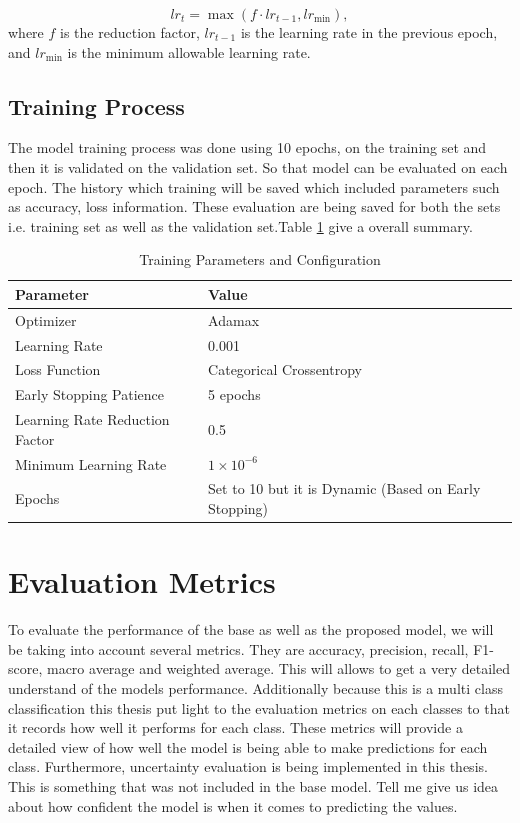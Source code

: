 \documentclass[12pt,onecolumn]{report}
\begin{document}
\begin{equation}
    lr_t = \max(f \cdot lr_{t-1}, lr_{\text{min}}),
\end{equation}
where \(f\) is the reduction factor, \(lr_{t-1}\) is the learning rate in the previous epoch, and \(lr_{\text{min}}\) is the minimum allowable learning rate.

\subsection{Training Process}
The model training process was done using 10 epochs, on the training set and then it is validated on the validation set. So that model can be evaluated on each epoch. The history which training will be saved which included parameters such as accuracy, loss information. These evaluation are being saved for both the sets i.e. training set as well as the validation set.Table \ref{tab:training_parameters} give a overall summary.

\begin{table}[h]
    \centering
    \caption{Training Parameters and Configuration}
    \label{tab:training_parameters}
    \begin{tabular}{|l|l|}
        \hline
        \textbf{Parameter} & \textbf{Value} \\
        \hline
        Optimizer          & Adamax \\
        Learning Rate      & 0.001 \\
        Loss Function      & Categorical Crossentropy \\
        Early Stopping Patience & 5 epochs \\
        Learning Rate Reduction Factor & 0.5 \\
        Minimum Learning Rate & \(1 \times 10^{-6}\) \\
        Epochs             & Set to 10 but it is Dynamic (Based on Early Stopping) \\
        \hline
    \end{tabular}
\end{table}

\section{Evaluation Metrics}

To evaluate the performance of the base as well as the proposed model, we will be taking into account several metrics. They are  accuracy, precision, recall, F1-score, macro average and weighted average. This will allows to get a very detailed understand of the models performance. Additionally because this is a multi class classification this thesis put light to the evaluation metrics on each classes to that it records how well it performs for each class. These metrics will provide a detailed view of how well the model is being able to make predictions for each class. Furthermore, uncertainty evaluation is being implemented in this thesis. This is something that was not included in the base model. Tell me give us idea about how confident the model is when it comes to predicting the values.
\end{document}
